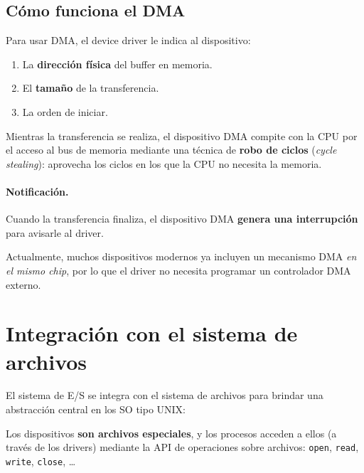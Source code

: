 \documentclass[11pt,a4paper]{article}
\begin{document}
\subsection{Cómo funciona el DMA}

Para usar DMA, el device driver le indica al dispositivo:

\begin{enumerate}[leftmargin=*,nosep]
    \item La \textbf{dirección física} del buffer en memoria.
    \item El \textbf{tamaño} de la transferencia.
    \item La orden de iniciar.
\end{enumerate}

Mientras la transferencia se realiza, el dispositivo DMA compite con la
CPU por el acceso al bus de memoria mediante una técnica de
\textbf{robo de ciclos} (\emph{cycle stealing}): aprovecha los ciclos
en los que la CPU no necesita la memoria.

\paragraph{Notificación.}
Cuando la transferencia finaliza, el dispositivo DMA \textbf{genera una
interrupción} para avisarle al driver.

\begin{idea}
Actualmente, muchos dispositivos modernos ya incluyen un mecanismo DMA
\emph{en el mismo chip}, por lo que el driver no necesita programar un
controlador DMA externo.
\end{idea}

\section{Integración con el sistema de archivos}

El sistema de E/S se integra con el sistema de archivos para brindar
una abstracción central en los SO tipo UNIX:

\begin{importante}
Los dispositivos \textbf{son archivos especiales}, y los procesos
acceden a ellos (a través de los drivers) mediante la API de
operaciones sobre archivos: \texttt{open}, \texttt{read},
\texttt{write}, \texttt{close}, \ldots
\end{importante}
\end{document}
